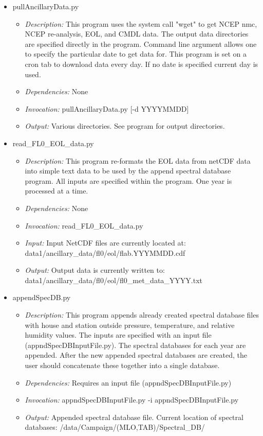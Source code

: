\documentclass[12pt, letterpaper]{article}
\begin{document}
\begin{itemize}
\item pullAncillaryData.py
\begin{itemize}
\item \textit{Description:} This program uses the system call "wget" to get NCEP nmc, NCEP re-analysis, EOL, and CMDL data. The output data directories are specified directly in the program. Command line argument allows one to specify the particular date to get data for. This program is set on a cron tab to download data every day. If no date is specified current day is used.
\item \textit{Dependencies:} None
\item \textit{Invocation:} pullAncillaryData.py [-d YYYYMMDD]
\item \textit{Output:} Various directories. See program for output directories.
\end{itemize}
\end{itemize}

\begin{itemize}
\item read\_FL0\_EOL\_data.py
\begin{itemize}
\item \textit{Description:} This program re-formats the EOL data from netCDF data into simple text data to be used by the append spectral database program. All inputs are specified within the program. One year is processed at a time.
\item \textit{Dependencies:} None
\item \textit{Invocation:} read\_FL0\_EOL\_data.py
\item \textit{Input:} Input NetCDF files are currently located at: data1/ancillary\_data/fl0/eol/flab.YYYMMDD.cdf
\item \textit{Output:} Output data is currently written to: data1/ancillary\_data/fl0/eol/fl0\_met\_data\_YYYY.txt
\end{itemize}
\end{itemize}

\begin{itemize}
\item appendSpecDB.py
\begin{itemize}
\item \textit{Description:} This program appends already created spectral database files with house and station outside pressure, temperature, and relative humidity values. The inputs are specified with an input file (appndSpecDBInputFile.py). The spectral databases for each year are appended. After the new appended spectral databases are created, the user should concatenate these together into a single database.
\item \textit{Dependencies:} Requires an input file (appndSpecDBInputFile.py)
\item \textit{Invocation:} appndSpecDBInputFile.py -i appndSpecDBInputFile.py
\item \textit{Output:} Appended spectral database file. Current location of spectral databases: /data/Campaign/(MLO,TAB)/Spectral\_DB/
\end{itemize}
\end{itemize}
\end{document}
